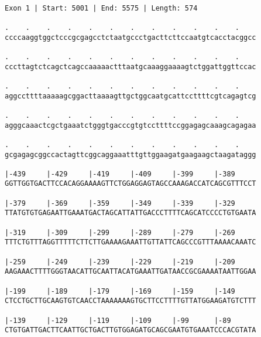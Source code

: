\documentclass{article}
\begin{document}
 \begin{Verbatim}
 
Exon 1 | Start: 5001 | End: 5575 | Length: 574
 
.    .    .    .    .    .    .    .    .    .    .    .    
ccccaaggtggctcccgcgagcctctaatgccctgacttcttccaatgtcacctacggcc
                                                            
.    .    .    .    .    .    .    .    .    .    .    .    
cccttagtctcagctcagccaaaaactttaatgcaaaggaaaagtctggattggttccac
                                                            
.    .    .    .    .    .    .    .    .    .    .    .    
aggccttttaaaaagcggacttaaaagttgctggcaatgcattccttttcgtcagagtcg
                                                            
.    .    .    .    .    .    .    .    .    .    .    .    
agggcaaactcgctgaaatctgggtgacccgtgtccttttccggagagcaaagcagagaa
                                                            
.    .    .    .    .    .    .    .    .    .    .    .    
gcgagagcggccactagttcggcaggaaatttgttggaagatgaagaagctaagataggg
                                                            
|-439     |-429     |-419     |-409     |-399     |-389     
GGTTGGTGACTTCCACAGGAAAAGTTCTGGAGGAGTAGCCAAAGACCATCAGCGTTTCCT
                                                            
|-379     |-369     |-359     |-349     |-339     |-329     
TTATGTGTGAGAATTGAAATGACTAGCATTATTGACCCTTTTCAGCATCCCCTGTGAATA
                                                            
|-319     |-309     |-299     |-289     |-279     |-269     
TTTCTGTTTAGGTTTTTCTTCTTGAAAAGAAATTGTTATTCAGCCCGTTTAAAACAAATC
                                                            
|-259     |-249     |-239     |-229     |-219     |-209     
AAGAAACTTTTGGGTAACATTGCAATTACATGAAATTGATAACCGCGAAAATAATTGGAA
                                                            
|-199     |-189     |-179     |-169     |-159     |-149     
CTCCTGCTTGCAAGTGTCAACCTAAAAAAAGTGCTTCCTTTTGTTATGGAAGATGTCTTT
                                                            
|-139     |-129     |-119     |-109     |-99      |-89      
CTGTGATTGACTTCAATTGCTGACTTGTGGAGATGCAGCGAATGTGAAATCCCACGTATA
                                                            

\end{Verbatim}
\end{document}
